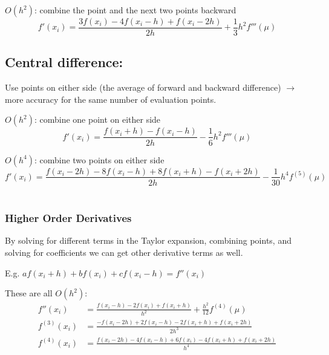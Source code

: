 \documentclass[12pt, answers]{exam}
\begin{document}
\underline{$O(h^2)$}: combine the point and the next two points backward
%
\[f'(x_i) = \frac{3 f(x_i) - 4f(x_i - h) + f(x_i - 2h)}{2h} + \frac{1}{3}h^2 f'''(\mu)\]

\subsection*{Central difference:}
Use points on either side (the average of forward and backward difference) $\rightarrow$ more accuracy for the same number of evaluation  points.

\underline{$O(h^2)$}: combine one point on either side
\[f'(x_i) = \frac{f(x_i + h) - f(x_i - h)}{2h} - \frac{1}{6}h^2 f'''(\mu)\]

\underline{$O(h^4)$}: combine two points on either side
\ifprintanswers
\[f'(x_i) = \frac{f(x_i - 2h) - 8f(x_i - h) + 8f(x_i + h) - f(x_i + 2h)}{2h} - \frac{1}{30}h^4 f^{(5)}(\mu)\]
\else
\\\vspace*{2em}
\fi

\subsubsection*{Higher Order Derivatives}
By solving for different terms in the Taylor expansion, combining points, and solving for coefficients we can get other derivative terms as well. 

E.g. $a f(x_i + h) + b f(x_i) + c f(x_i - h) = f''(x_i)$

These are all $O(h^2)$:
\begin{align*}
f''(x_i) &= \frac{f(x_i - h) - 2f(x_i) + f(x_i + h)}{h^2} + \frac{h^2}{12}f^{(4)}(\mu) \\
%
f^{(3)}(x_i) &= \frac{-f(x_i - 2h) + 2f(x_i - h) - 2f(x_i + h) + f(x_i + 2h)}{2h^3}\\
%
f^{(4)}(x_i) &= \frac{f(x_i - 2h) - 4f(x_i - h) +6f(x_i) - 4f(x_i + h) + f(x_i + 2h)}{h^4}
\end{align*}
\end{document}

